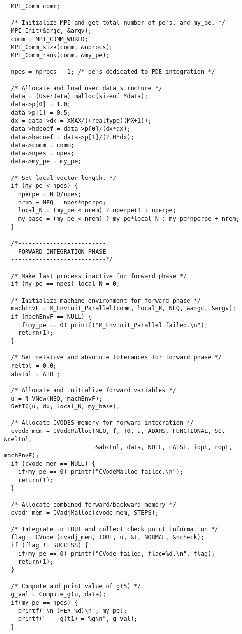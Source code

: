 \begin{verbatim}
  MPI_Comm comm;

  /* Initialize MPI and get total number of pe's, and my_pe. */
  MPI_Init(&argc, &argv);
  comm = MPI_COMM_WORLD;
  MPI_Comm_size(comm, &nprocs);
  MPI_Comm_rank(comm, &my_pe);

  npes = nprocs - 1; /* pe's dedicated to PDE integration */

  /* Allocate and load user data structure */
  data = (UserData) malloc(sizeof *data);
  data->p[0] = 1.0;
  data->p[1] = 0.5;
  dx = data->dx = XMAX/((realtype)(MX+1));
  data->hdcoef = data->p[0]/(dx*dx);
  data->hacoef = data->p[1]/(2.0*dx);
  data->comm = comm;
  data->npes = npes;
  data->my_pe = my_pe;

  /* Set local vector length. */
  if (my_pe < npes) {
    nperpe = NEQ/npes;
    nrem = NEQ - npes*nperpe;
    local_N = (my_pe < nrem) ? nperpe+1 : nperpe;
    my_base = (my_pe < nrem) ? my_pe*local_N : my_pe*nperpe + nrem;
  }

  /*------------------------- 
    FORWARD INTEGRATION PHASE 
  ---------------------------*/

  /* Make last process inactive for forward phase */
  if (my_pe == npes) local_N = 0;

  /* Initialize machine environment for forward phase */
  machEnvF = M_EnvInit_Parallel(comm, local_N, NEQ, &argc, &argv);
  if (machEnvF == NULL) {
    if(my_pe == 0) printf("M_EnvInit_Parallel failed.\n"); 
    return(1);
  }

  /* Set relative and absolute tolerances for forward phase */
  reltol = 0.0;
  abstol = ATOL;

  /* Allocate and initialize forward variables */
  u = N_VNew(NEQ, machEnvF);
  SetIC(u, dx, local_N, my_base);

  /* Allocate CVODES memory for forward integration */
  cvode_mem = CVodeMalloc(NEQ, f, T0, u, ADAMS, FUNCTIONAL, SS, &reltol,
                          &abstol, data, NULL, FALSE, iopt, ropt, machEnvF);
  if (cvode_mem == NULL) {
    if(my_pe == 0) printf("CVodeMalloc failed.\n"); 
    return(1);
  }

  /* Allocate combined forward/backward memory */
  cvadj_mem = CVadjMalloc(cvode_mem, STEPS);

  /* Integrate to TOUT and collect check point information */
  flag = CVodeF(cvadj_mem, TOUT, u, &t, NORMAL, &ncheck);
  if (flag != SUCCESS) {
    if(my_pe == 0) printf("CVode failed, flag=%d.\n", flag);
    return(1);
  }

  /* Compute and print value of g(5) */
  g_val = Compute_g(u, data);
  if(my_pe == npes) {
    printf("\n (PE# %d)\n", my_pe);
    printf("    g(t1) = %g\n", g_val);
  }


\end{verbatim}
